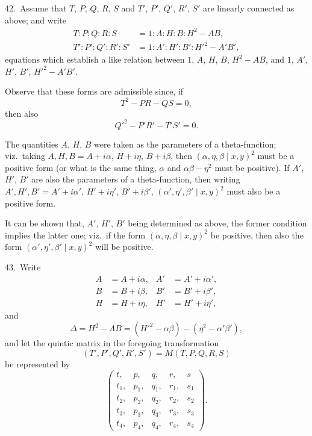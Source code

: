 \documentclass[11pt,a4paper]{article}
\theoremstyle{definition}
\begin{document}
42.\ Assume that $T$, $P$, $Q$, $R$, $S$ and $T'$, $P'$, $Q'$, $R'$, $S'$ are linearly connected as above; and write
\begin{align*}
T : P : Q : R : S &= 1 : A : H : B : H^2 - AB,\\
T' : P' : Q' : R' : S' &= 1 : A' : H' : B' : H'^2 - A'B',
\end{align*}
equations which establish a like relation between $1$, $A$, $H$, $B$, $H^2 - AB$, and $1$, $A'$, $H'$, $B'$, $H'^2 - A'B'$.

Observe that these forms are admissible since, if
\[
T^2 - PR - QS = 0,
\]
then also
\[
Q'^2 - P'R' - T'S' = 0.
\]

The quantities $A$, $H$, $B$ were taken as the parameters of a theta-function; viz.\ taking $A, H, B = A + i\alpha$, $H + i\eta$, $B + i\beta$, then $(\alpha, \eta, \beta \mid x, y)^2$ must be a positive form (or what is the same thing, $\alpha$ and $\alpha\beta - \eta^2$ must be positive). If $A'$, $H'$, $B'$ are also the parameters of a theta-function, then writing $A', H', B' = A' + i\alpha'$, $H' + i\eta'$, $B' + i\beta'$, $(\alpha', \eta', \beta' \mid x, y)^2$ must also be a positive form.

It can be shown that, $A'$, $H'$, $B'$ being determined as above, the former condition implies the latter one; viz.\ if the form $(\alpha, \eta, \beta \mid x, y)^2$ be positive, then also the form $(\alpha', \eta', \beta' \mid x, y)^2$ will be positive.

\medskip

43.\ Write
\begin{align*}
A &= A + i\alpha, & A' &= A' + i\alpha',\\
B &= B + i\beta, & B' &= B' + i\beta',\\
H &= H + i\eta, & H' &= H' + i\eta',
\end{align*}
and
\[
\Delta = H^2 - AB = (H'^2 - \alpha\beta) - (\eta^2 - \alpha'\beta'),
\]
and let the quintic matrix in the foregoing transformation
\[
(T', P', Q', R', S') = M(T, P, Q, R, S)
\]
be represented by
\[
\begin{pmatrix}
t, & p, & q, & r, & s\\
t_1, & p_1, & q_1, & r_1, & s_1\\
t_2, & p_2, & q_2, & r_2, & s_2\\
t_3, & p_3, & q_3, & r_3, & s_3\\
t_4, & p_4, & q_4, & r_4, & s_4
\end{pmatrix}.
\]

\newpage
\end{document}
